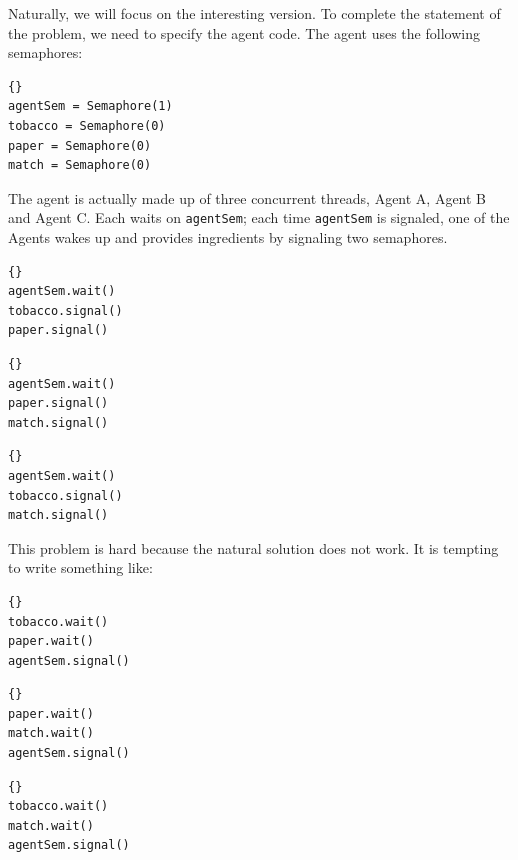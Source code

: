 \documentclass{book}
\begin{document}
Naturally, we will focus on the interesting version.  To complete
the statement of the problem, we need to specify the agent code.
The agent uses the following semaphores:

\begin{latin}
\begin{latin}
\begin{lstlisting}[title={Agent semaphores}]{}
agentSem = Semaphore(1)
tobacco = Semaphore(0)
paper = Semaphore(0)
match = Semaphore(0)
\end{lstlisting}
\end{latin}
\end{latin}

The agent is actually made up of three concurrent
threads, Agent A, Agent B and Agent C.  Each waits on
{\tt agentSem}; each time {\tt agentSem} is signaled,
one of the Agents wakes up and provides ingredients by
signaling two semaphores.

\begin{latin}
\begin{latin}
\begin{lstlisting}[title={Agent A code}]{}
agentSem.wait()
tobacco.signal()
paper.signal()
\end{lstlisting}
\end{latin}


\begin{latin}
\begin{lstlisting}[title={Agent B code}]{}
agentSem.wait()
paper.signal()
match.signal()
\end{lstlisting}
\end{latin}

\begin{latin}
\begin{lstlisting}[title={Agent C code}]{}
agentSem.wait()
tobacco.signal()
match.signal()
\end{lstlisting}
\end{latin}
\end{latin}

This problem is hard because the natural solution does not
work.  It is tempting to write something like:

\begin{latin}
\begin{latin}
\begin{lstlisting}[title={Smoker with matches}]{}
tobacco.wait()
paper.wait()
agentSem.signal()
\end{lstlisting}
\end{latin}

\begin{latin}
\begin{lstlisting}[title={Smoker with tobacco}]{}
paper.wait()
match.wait()
agentSem.signal()
\end{lstlisting}
\end{latin}

\begin{latin}
\begin{lstlisting}[title={Smoker with paper}]{}
tobacco.wait()
match.wait()
agentSem.signal()
\end{lstlisting}
\end{latin}
\end{latin}
\end{document}

